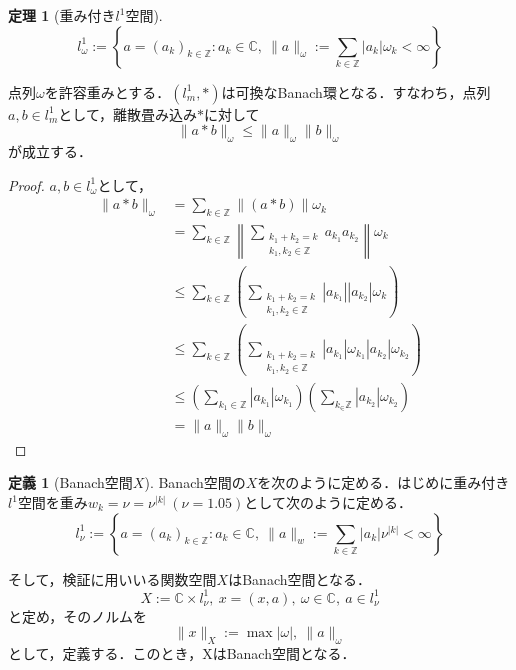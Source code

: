 \documentclass[11pt,a4paper,titlepage]{jsreport}
\theoremstyle{definition}
\newtheorem{dfn}{定義}
\newtheorem{thm}{定理}
\begin{document}
\begin{thm}[重み付き$l^1$空間]
  \begin{equation*}
    l_\omega^1 := \left\{ a = (a_k)_{k\in\mathbb{Z}}:a_k\in\mathbb{C},\ \|a\|_\omega:=\sum_{k\in\mathbb{Z}}|a_k|\omega_k < \infty\right\}
  \end{equation*}

  点列$\omega$を許容重みとする．$\left(l_m^1, *\right)$は可換なBanach環となる．すなわち，点列$a,b\in l^1_m$として，離散畳み込み$*$に対して
  \begin{equation*}
    \|a*b\|_\omega \leq \|a\|_\omega\|b\|_\omega
  \end{equation*}
  が成立する．
\end{thm}

\begin{proof}
  $a,b\in l_{\omega}^1$として，
  \begin{equation*}
    \begin{split}
      \|a*b\|_\omega &= \sum_{k\in\mathbb{Z}} \|(a*b)\|\omega_k \\
      &= \sum_{k\in\mathbb{Z}} \left\|\sum_{\substack{k_1+k_2=k \\ k_1,k_2\in\mathbb{Z}}}a_{k_1} a_{k_2}\right\| \omega_k \\
      &\leq \sum_{k\in\mathbb{Z}} \left(\sum_{\substack{k_1+k_2=k \\ k_1,k_2\in\mathbb{Z}}}|a_{k_1}||a_{k_2}|\omega_k\right)\\
      &\leq \sum_{k\in\mathbb{Z}} \left(\sum_{\substack{k_1+k_2=k \\ k_1,k_2\in\mathbb{Z}}}|a_{k_1}|\omega_{k_1}|a_{k_2}|\omega_{k_2}\right)\\
      &\leq \left(\sum_{k_1\in\mathbb{Z}}|a_{k_1}|\omega_{k_1}\right) \left(\sum_{k_\in\mathbb{Z}}|a_{k_2}|\omega_{k_2}\right) \\
      &= \|a\|_\omega\|b\|_\omega
    \end{split}
  \end{equation*}
\end{proof}

\begin{dfn}[Banach空間$X$]
  Banach空間の$X$を次のように定める．はじめに重み付き$l^1$空間を重み$w_k=\nu=\nu^{|k|}\ (\nu=1.05)$として次のように定める．
  \begin{equation*}
    l_{\nu}^1 := \left\{ a = (a_k)_{k\in\mathbb{Z}}:a_k\in\mathbb{C},\ \|a\|_{w} := \sum_{k\in\mathbb{Z}}|a_k|\nu^{|k|} < \infty\right\}
  \end{equation*}

  そして，検証に用いいる関数空間$X$はBanach空間となる．
  \begin{equation*}
    X:=\mathbb{C}\times l_{\nu}^1,\ x=(x,a),\ \omega \in \mathbb{C},\ a\in l_{\nu}^1
  \end{equation*}
  と定め，そのノルムを
  \begin{equation*}
    \|x\|_X:=\max |\omega|,\ \|a\|_{\omega}
  \end{equation*}
  として，定義する．このとき，XはBanach空間となる．
\end{dfn}
\end{document}
